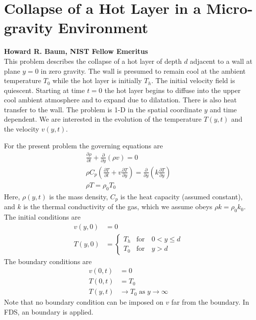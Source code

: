 \documentclass[11pt]{book}
\begin{document}
\section{Collapse of a Hot Layer in a Micro-gravity Environment}
\label{sec:baum_hot_layer}

\textbf{Howard R. Baum, NIST Fellow Emeritus}\\

\noindent This problem describes the collapse of a hot layer of depth $d$ adjacent to a wall at plane $y=0$ in zero gravity.  The wall is presumed to remain cool at the ambient temperature $T_0$ while the hot layer is initially $T_h$.  The initial velocity field is quiescent.  Starting at time $t=0$ the hot layer begins to diffuse into the upper cool ambient atmosphere and to expand due to dilatation.  There is also heat transfer to the wall.  The problem is 1-D in the spatial coordinate $y$ and time dependent.  We are interested in the evolution of the temperature $T(y,t)$ and the velocity $v(y,t)$.

For the present problem the governing equations are
\begin{gather}
\frac{\partial \rho}{\partial t} + \frac{\partial}{\partial y}(\rho v) = 0 \\
\rho C_p \left( \frac{\partial T}{\partial t} + v \frac{\partial T}{\partial y} \right) = \frac{\partial}{\partial y} \left( k \frac{\partial T}{\partial y} \right) \\
\rho T = \rho_0 T_0
\end{gather}
Here, $\rho(y,t)$ is the mass density, $C_p$ is the heat capacity (assumed constant), and $k$ is the thermal conductivity of the gas, which we assume obeys $\rho k = \rho_0 k_0$. The initial conditions are
\begin{align}
v(y,0) &= 0 \\
T(y,0) &= \left\{ \begin{array}{ll} T_h & \mbox{for} \quad 0 < y \le d \\ T_0 & \mbox{for} \quad y > d \end{array} \right.
\end{align}
The boundary conditions are
\begin{align}
v(0,t) &= 0 \\
T(0,t) &= T_0 \\
T(y,t) &\rightarrow T_0 \;\mbox{as}\; y\rightarrow\infty
\end{align}
Note that no boundary condition can be imposed on $v$ far from the boundary.  In FDS, an  boundary is applied.
\end{document}
